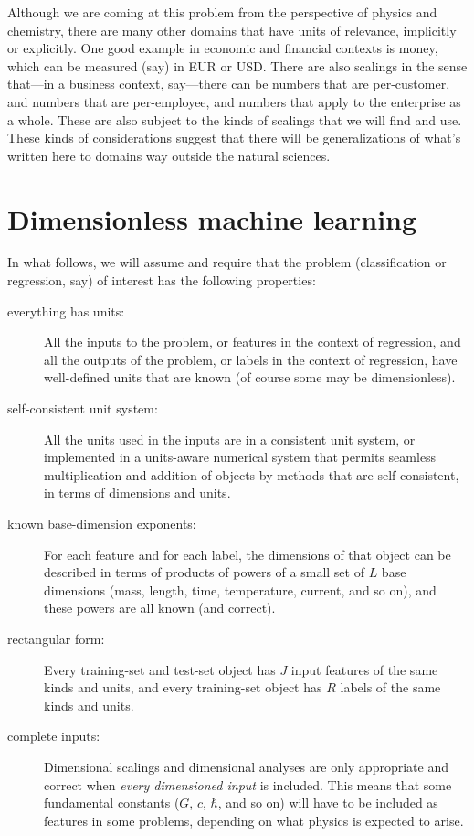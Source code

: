 \documentclass[12pt, letterpaper]{article}
\begin{document}
Although we are coming at this problem from the perspective of physics and chemistry, there are many other domains that have units of relevance, implicitly or explicitly.
One good example in economic and financial contexts is money, which can be measured (say) in EUR or USD.
There are also scalings in the sense that---in a business context, say---there can be numbers that are per-customer, and numbers that are per-employee, and numbers that apply to the enterprise as a whole.
These are also subject to the kinds of scalings that we will find and use.
These kinds of considerations suggest that there will be generalizations of what's written here to domains way outside the natural sciences.

\section{Dimensionless machine learning}

In what follows, we will assume and require that the problem (classification or regression, say) of interest has the following properties:
\begin{description}
    \item[everything has units:] All the inputs to the problem, or features in the context of regression, and all the outputs of the problem, or labels in the context of regression, have well-defined units that are known (of course some may be dimensionless).
    \item[self-consistent unit system:] All the units used in the inputs are in a consistent unit system, or implemented in a units-aware numerical system that permits seamless multiplication and addition of objects by methods that are self-consistent, in terms of dimensions and units.
    \item[known base-dimension exponents:] For each feature and for each label, the dimensions of that object can be described in terms of products of powers of a small set of $L$ base dimensions (mass, length, time, temperature, current, and so on), and these powers are all known (and correct).
    \item[rectangular form:] Every training-set and test-set object has $J$ input features of the same kinds and units, and every training-set object has $R$ labels of the same kinds and units.
    \item[complete inputs:] Dimensional scalings and dimensional analyses are only appropriate and correct when \emph{every dimensioned input} is included. This means that some fundamental constants ($G$, $c$, $\hbar$, and so on) will have to be included as features in some problems, depending on what physics is expected to arise.
\end{description}
\end{document}
